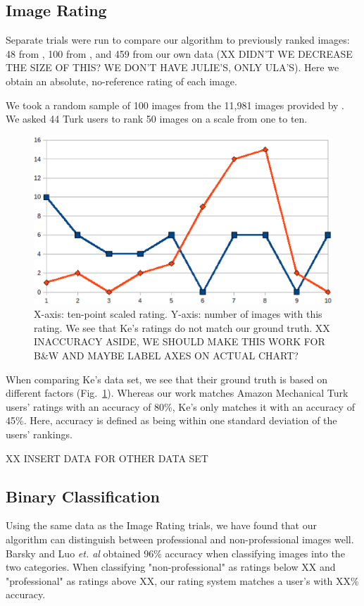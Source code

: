 \documentclass[twocolumn]{article}
\begin{document}
\subsection{Image Rating} Separate trials were run to compare our algorithm to previously ranked images: 48 from \cite{1640788}, 100 from \cite{springerlink:10.1007/978-3-540-88690-7_29}, and 459 from our own data (XX DIDN'T WE DECREASE THE SIZE OF THIS? WE DON'T HAVE JULIE'S, ONLY ULA'S). Here we obtain an absolute, no-reference rating of each image.

We took a random sample of 100 images from the 11,981 images provided by \cite{springerlink:10.1007/978-3-540-88690-7_29}. We asked 44 Turk users to rank 50 images on a scale from one to ten.

\begin{figure}
  \centering
    \includegraphics[scale=0.40,clip]{ke_vs_us.eps}
  \caption{X-axis: ten-point scaled rating.  Y-axis: number of images with this rating. We see that Ke's ratings do not match our ground truth. XX INACCURACY ASIDE, WE SHOULD MAKE THIS WORK FOR B\&W AND MAYBE LABEL AXES ON ACTUAL CHART?}
  \label{fig:ke_vs_us}
\end{figure}
When comparing Ke's data set, we see that their ground truth is based on different factors (Fig.~\ref{fig:ke_vs_us}). Whereas our work matches Amazon Mechanical Turk users' ratings with an accuracy of 80\%, Ke's only matches it with an accuracy of 45\%. Here, accuracy is defined as being within one standard deviation of the users' rankings.

XX INSERT DATA FOR OTHER DATA SET

\subsection{Binary Classification} Using the same data as the Image Rating trials, we have found that our algorithm can distinguish between professional and non-professional images well. Barsky \cite{Yeh:2010:PPR:1873951.1873963} and Luo \emph{et. al}\cite{springerlink:10.1007/978-3-540-88690-7_29} obtained 96\% accuracy when classifying images into the two categories. When classifying "non-professional" as ratings below XX and "professional" as ratings above XX, our rating system matches a user's with XX\% accuracy.
\end{document}
